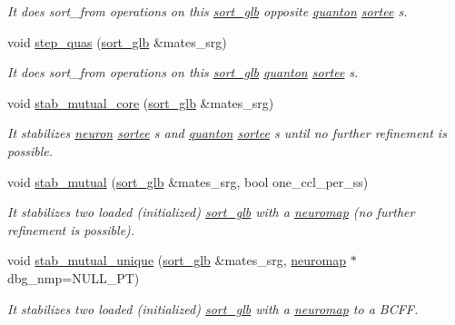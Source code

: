 \begin{DoxyCompactItemize}
\begin{DoxyCompactList}\small\item\em It does sort\+\_\+from operations on this \hyperlink{classsort__glb}{sort\+\_\+glb} opposite \hyperlink{classquanton}{quanton} \hyperlink{classsortee}{sortee} s. \end{DoxyCompactList}\item 
void \hyperlink{classsort__glb_aa41c7303e4bae7eb7c466f119c3ace1f}{step\+\_\+quas} (\hyperlink{classsort__glb}{sort\+\_\+glb} \&mates\+\_\+srg)\hypertarget{classsort__glb_aa41c7303e4bae7eb7c466f119c3ace1f}{}\label{classsort__glb_aa41c7303e4bae7eb7c466f119c3ace1f}

\begin{DoxyCompactList}\small\item\em It does sort\+\_\+from operations on this \hyperlink{classsort__glb}{sort\+\_\+glb} \hyperlink{classquanton}{quanton} \hyperlink{classsortee}{sortee} s. \end{DoxyCompactList}\item 
void \hyperlink{classsort__glb_a314081679beafcbbeac7f2e504558f18}{stab\+\_\+mutual\+\_\+core} (\hyperlink{classsort__glb}{sort\+\_\+glb} \&mates\+\_\+srg)
\begin{DoxyCompactList}\small\item\em It stabilizes \hyperlink{classneuron}{neuron} \hyperlink{classsortee}{sortee} s and \hyperlink{classquanton}{quanton} \hyperlink{classsortee}{sortee} s until no further refinement is possible. \end{DoxyCompactList}\item 
void \hyperlink{classsort__glb_ad87061a8532cc773200ba06d939a6dfc}{stab\+\_\+mutual} (\hyperlink{classsort__glb}{sort\+\_\+glb} \&mates\+\_\+srg, bool one\+\_\+ccl\+\_\+per\+\_\+ss)
\begin{DoxyCompactList}\small\item\em It stabilizes two \textquotesingle{}loaded\textquotesingle{} (initialized) \hyperlink{classsort__glb}{sort\+\_\+glb} with a \hyperlink{classneuromap}{neuromap} (no further refinement is possible). \end{DoxyCompactList}\item 
void \hyperlink{classsort__glb_abcd6c73d28df5efcf002c2aed63ccd92}{stab\+\_\+mutual\+\_\+unique} (\hyperlink{classsort__glb}{sort\+\_\+glb} \&mates\+\_\+srg, \hyperlink{classneuromap}{neuromap} $\ast$dbg\+\_\+nmp=N\+U\+L\+L\+\_\+\+PT)
\begin{DoxyCompactList}\small\item\em It stabilizes two \textquotesingle{}loaded\textquotesingle{} (initialized) \hyperlink{classsort__glb}{sort\+\_\+glb} with a \hyperlink{classneuromap}{neuromap} to a B\+C\+FF. \end{DoxyCompactList}\end{DoxyCompactItemize}



